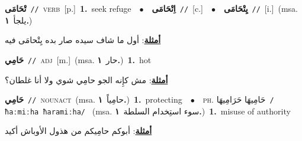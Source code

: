 \documentclass[10pt,a4paper,twoside]{article} %
\begin{document}
\begin{multicols}{2}
{\setlength\topsep{0pt}\textbf{\foreignlanguage{arabic}{تْحَامَى}}\ {\color{gray}\texttt{//}\color{black}}\ \textsc{verb}\ [p.]\ \textbf{1.}~seek refuge\ \ $\bullet$\ \ \setlength\topsep{0pt}\textbf{\foreignlanguage{arabic}{اِتْحَامَى}}\ {\color{gray}\texttt{//}\color{black}}\ [c.]\ \ $\bullet$\ \ \setlength\topsep{0pt}\textbf{\foreignlanguage{arabic}{يِتْحَامَى}}\ {\color{gray}\texttt{//}\color{black}}\ [i.]\ \color{gray}(msa. \foreignlanguage{arabic}{يلجأ}~\foreignlanguage{arabic}{\textbf{١.}})\color{black}\  \begin{flushright}\color{gray}\foreignlanguage{arabic}{\textbf{\underline{\foreignlanguage{arabic}{أمثلة}}}: أول ما شاف سيده صار بده يِتْحامَى فيه}\end{flushright}\color{black}} \vspace{2mm}

{\setlength\topsep{0pt}\textbf{\foreignlanguage{arabic}{حَامِي}}\ {\color{gray}\texttt{//}\color{black}}\ \textsc{adj}\ [m.]\ \color{gray}(msa. \foreignlanguage{arabic}{حار}~\foreignlanguage{arabic}{\textbf{١.}})\color{black}\ \textbf{1.}~hot\  \begin{flushright}\color{gray}\foreignlanguage{arabic}{\textbf{\underline{\foreignlanguage{arabic}{أمثلة}}}: مش كإِنه الجو حامِي شوي ولا أنا غلطان؟}\end{flushright}\color{black}} \vspace{2mm}

{\setlength\topsep{0pt}\textbf{\foreignlanguage{arabic}{حَامِي}}\ {\color{gray}\texttt{//}\color{black}}\ \textsc{noun\textunderscore act}\ \color{gray}(msa. \foreignlanguage{arabic}{حامِياً}~\foreignlanguage{arabic}{\textbf{١.}})\color{black}\ \textbf{1.}~protecting\ \ $\bullet$\ \ \textsc{ph.} \color{gray} \foreignlanguage{arabic}{حَامِيهَا حَرَامِيهَا}\color{black}\ {\color{gray}\texttt{/{\sffamily ħaːmiːha ħaramiːha}/}\color{black}}\ \color{gray} (msa. \foreignlanguage{arabic}{سوء استِخدام السلطة}~\foreignlanguage{arabic}{\textbf{١.}})\color{black}\ \textbf{1.}~misuse of authority\  \begin{flushright}\color{gray}\foreignlanguage{arabic}{\textbf{\underline{\foreignlanguage{arabic}{أمثلة}}}: أبوكم حامِيكم من هذول الأوباش أكيد}\end{flushright}\color{black}} \vspace{2mm}


\end{multicols}
\end{document}
